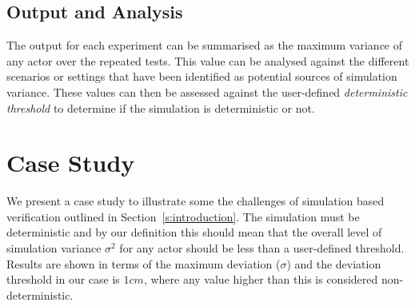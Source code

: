 \documentclass[letterpaper, 10 pt, journal, twoside]{IEEEtran}
\begin{document}

\subsection{Output and Analysis}
The output for each experiment can be summarised as the maximum variance of any actor over the repeated tests. This value can be analysed against the different scenarios or settings that have been identified as potential sources of simulation variance. These values can then be assessed against the user-defined \textit{deterministic threshold} to determine if the simulation is deterministic or not.




\section{Case Study} \label{s:case-study}
We present a case study to illustrate some the challenges of simulation based verification outlined in Section~\ref{s:introduction}. The simulation must be deterministic and by our definition this should mean that the overall level of simulation variance $\sigma^2$ for any actor should be less than a user-defined threshold. Results are shown in terms of the maximum deviation ($\sigma$) and the deviation threshold in our case is $1cm$, where any value higher than this is considered non-deterministic. 
\end{document}

